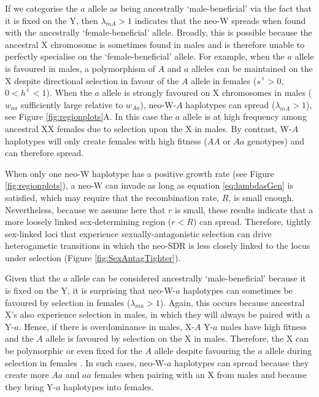\documentclass[12pt]{article}
\begin{document}
If we categorise the $a$ allele as being ancestrally `male-beneficial' via the fact that it is fixed on the Y, then $\lambda_{mA}>1$ indicates that the neo-W spreads when found with the ancestrally `female-beneficial' allele. 
Broadly, this is possible because the ancestral X chromosome is sometimes found in males and is therefore unable to perfectly specialise on the `female-beneficial' allele. 
For example, when the $a$ allele is favoured in males, a polymorphism of $A$ and $a$ alleles can be maintained on the X despite directional selection in favour of the $A$ allele in females ($s^\female>0$, $0<h^\female<1$). 
When the $a$ allele is strongly favoured on X chromosomes in males ($w_{aa}$ sufficiently large relative to $w_{Aa}$), neo-W-$A$ haplotypes can spread ($\lambda_{mA}>1$), see Figure \ref{fig:regionplots}A.
In this case the $a$ allele is at high frequency among ancestral XX females due to selection upon the X in males. 
By contrast, W-$A$ haplotypes will only create females with high fitness ($AA$ or $Aa$ genotypes) and can therefore spread. 

When only one neo-W haplotype has a positive growth rate (see Figure \ref{fig:regionplots}), a neo-W can invade as long as equation \eqref{eq:lambdasGen} is satisfied, which may require that the recombination rate, $R$, is small enough.
Nevertheless, because we assume here that $r$ is small, these results indicate that a more loosely linked sex-determining region ($r<R$) can spread.
Therefore, tightly sex-linked loci that experience sexually-antagonistic selection can drive heterogametic transitions in which the neo-SDR is less closely linked to the locus under selection (Figure \ref{fig:SexAntagTighter}). 

Given that the $a$ allele can be considered ancestrally `male-beneficial' because it is fixed on the Y, it is surprising that neo-W-$a$ haplotypes can sometimes be favoured by selection in females ($\lambda_{ma}>1$). 
Again, this occurs because ancestral X's also experience selection in males, in which they will always be paired with a Y-$a$. 
Hence, if there is overdominance in males, X-$A$ Y-$a$ males have high fitness and the $A$ allele is favoured by selection on the X in males. 
Therefore, the X can be polymorphic or even fixed for the $A$ allele despite favouring the $a$ allele during selection in females \citep[e.g., see outlined region in Figure \ref{fig:regionplots}B and][]{Lloyd1977,Otto2014}. 
In such cases, neo-W-$a$ haplotypes can spread because they create more $Aa$ and $aa$ females when pairing with an X from males and because they bring Y-$a$ haplotypes into females. 
\end{document}
